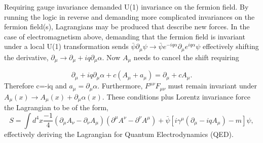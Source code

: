 Requiring gauge invariance demanded U(1) invariance on the fermion field. By running the logic in reverse and demanding more complicated invariances on the fermion field(s), Lagrangians may be produced that describe new forces. In the case of electromagnetism above, demanding that the fermion field is invariant under a local U(1) transformation sends $\bar{\psi}\partial_\mu\psi \rightarrow \bar{\psi} e^{-iq\alpha} \partial_\mu e^{iq\alpha} \psi$ effectively shifting the derivative, $\partial_\mu \rightarrow \partial_\mu + iq\partial_\mu\alpha$. Now $A_\mu$ needs to cancel the shift requiring 

\begin{equation}
\partial_\mu + iq\partial_\mu\alpha + c(A_\mu + a_\mu) = \partial_\mu + cA_\mu. 
\end{equation}
Therefore c=-iq and $a_\mu = \partial_\mu\alpha$. Furthermore, $F^{\mu\nu}F_{\mu\nu}$ must remain invariant under $A_\mu(x) \rightarrow A_\mu(x) + \partial_\mu\alpha(x)$. These conditions plus Lorentz invariance force the Lagrangian to be of the form, 
\begin{equation}
S = \int d^4x \frac{-1}{4}(\partial_\mu A_\nu - \partial_\nu A_\mu)(\partial^\mu A^\nu - \partial^\nu A^\mu) + \bar{\psi}\left[i\gamma^\mu\left(\partial_\mu - iqA_\mu\right) - m \right]\psi, 
\end{equation}
effectively deriving the Lagrangian for Quantum Electrodynamics (QED).


